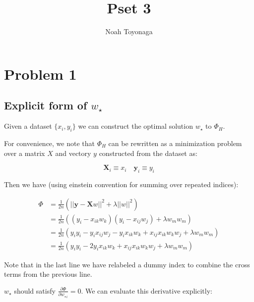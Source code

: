 \documentclass{article}
\title{Pset 3}
\author{Noah Toyonaga}
\begin{document}
\maketitle

\section{Problem 1}%
\label{sec:Problem 1}

\subsection{Explicit form of $w_\star$}%

Given a dataset $\{x_i, y_i\}$ we can construct the optimal solution $w_\star$ to $\Phi_H$.

For convenience, we note that $\Phi_H$ can be rewritten as a minimization problem over a matrix $X$ and vectory $y$ constructed from the dataset as: 

\begin{equation}
	\bm{X}_{i} \equiv x_i \quad \bm{y}_i \equiv y_i
\end{equation}

Then we have (using einstein convention for summing over repeated indices):

\begin{equation}\label{eq:phi_hard_expanded}
\begin{split}
	\Phi &= \frac{1}{2n} \left( \left| \left| \bm{y} - \bm{X}w \right| \right|^2 + \lambda \left| \left| w \right| \right|^2 \right)\\
	     &= \frac{1}{2n}\left(\left(y_i-x_{ik}w_k\right)\left( y_i - x_{ij}w_j \right) + \lambda w_mw_m\right) \\
	     &=  \frac{1}{2n}\left(y_iy_i - y_ix_{ij}w_j - y_ix_{ik}w_k + x_{ij}x_{ik}w_kw_j+ \lambda w_mw_m\right)  \\
	     &=  \frac{1}{2n}\left(y_iy_i - 2y_ix_{ik}w_k + x_{ij}x_{ik}w_kw_j+ \lambda w_mw_m\right) 
\end{split}
\end{equation}

Note that in the last line we have relabeled a dummy index to combine the cross terms from the previous line.

$w_\star$ should satisfy $ \frac{\partial \Phi}{\partial {w_\star}_i} = 0$. We can evaluate this derivative explicitly:
\end{document}
